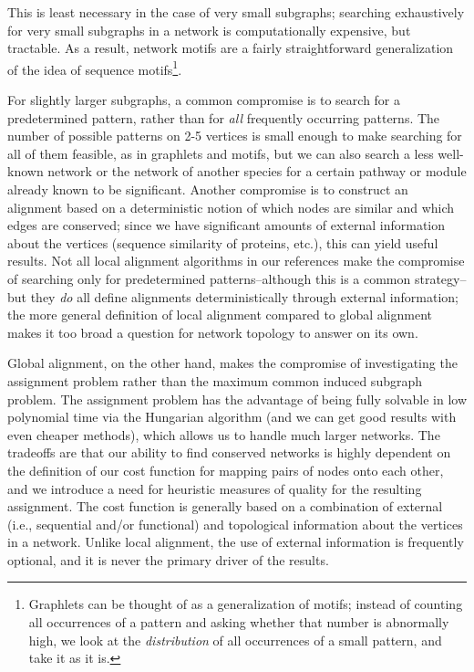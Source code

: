 \documentclass[12pt]{thesis}
\theoremstyle{plain}
\theoremstyle{definition}
\theoremstyle{remark}
\begin{document}
This is least necessary in the case of very small subgraphs; searching exhaustively for very small subgraphs in a network is computationally expensive, but tractable. As a result, network motifs are a fairly straightforward generalization of the idea of sequence motifs\footnote{Graphlets can be thought of as a generalization of motifs; instead of counting all occurrences of a pattern and asking whether that number is abnormally high, we look at the \textit{distribution} of all occurrences of a small pattern, and take it as it is.}.

For slightly larger subgraphs, a common compromise is to search for a predetermined pattern, rather than for \textit{all} frequently occurring patterns. The number of possible patterns on 2-5 vertices is small enough to make searching for all of them feasible, as in graphlets and motifs, but we can also search a less well-known network or the network of another species for a certain pathway or module already known to be significant. Another compromise is to construct an alignment based on a deterministic notion of which nodes are similar and which edges are conserved; since we have significant amounts of external information about the vertices (sequence similarity of proteins, etc.), this can yield useful results. Not all local alignment algorithms in our references make the compromise of searching only for predetermined patterns--although this is a common strategy--but they \textit{do} all define alignments deterministically through external information; the more general definition of local alignment compared to global alignment makes it too broad a question for network topology to answer on its own.

Global alignment, on the other hand, makes the compromise of investigating the assignment problem rather than the maximum common induced subgraph problem. The assignment problem has the advantage of being fully solvable in low polynomial time via the Hungarian algorithm (and we can get good results with even cheaper methods), which allows us to handle much larger networks. The tradeoffs are that our ability to find conserved networks is highly dependent on the definition of our cost function for mapping pairs of nodes onto each other, and we introduce a need for heuristic measures of quality for the resulting assignment. The cost function is generally based on a combination of external (i.e., sequential and/or functional) and topological information about the vertices in a network. Unlike local alignment, the use of external information is frequently optional, and it is never the primary driver of the results.
\end{document}
